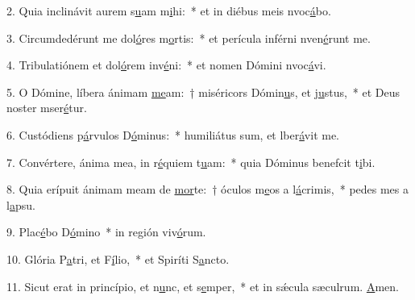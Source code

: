 2. Quia inclinávit aurem s\uline{u}am m\uline{i}hi:~* et in diébus meis nvoc\uline{á}bo.\par 
3. Circumdedérunt me dol\uline{ó}res m\uline{o}rtis:~* et perícula inférni nven\uline{é}runt me.\par 
4. Tribulatiónem et dol\uline{ó}rem inv\uline{é}ni:~* et nomen Dómini nvoc\uline{á}vi.\par 
5. O Dómine, líbera ánimam \uline{me}am:~† miséricors Dómin\uline{u}s, et j\uline{u}stus,~* et Deus noster mser\uline{é}tur.\par 
6. Custódiens p\uline{á}rvulos D\uline{ó}minus:~* humiliátus sum, et lber\uline{á}vit me.\par 
7. Convértere, ánima mea, in r\uline{é}quiem t\uline{u}am:~* quia Dóminus benefcit t\uline{i}bi.\par 
8. Quia erípuit ánimam meam de \uline{mor}te:~† óculos m\uline{e}os a l\uline{á}crimis,~* pedes mes a l\uline{a}psu.\par 
9. Plac\uline{é}bo D\uline{ó}mino~* in región viv\uline{ó}rum.\par 
10. Glória P\uline{a}tri, et F\uline{í}lio,~* et Spiríti S\uline{a}ncto.\par 
11. Sicut erat in princípio, et n\uline{u}nc, et s\uline{e}mper,~* et in sǽcula sæculrum. \uline{A}men.\par 

